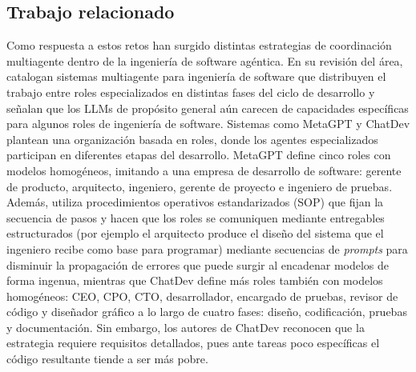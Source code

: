 \subsection{Trabajo relacionado}
\label{sec:trabajo-relacionado}

Como respuesta a estos retos han surgido distintas estrategias de coordinación multiagente dentro de la ingeniería de software agéntica. En su revisión del área, \textcite{he2025masse} catalogan sistemas multiagente para ingeniería de software que distribuyen el trabajo entre roles especializados en distintas fases del ciclo de desarrollo y señalan que los LLMs de propósito general aún carecen de capacidades específicas para algunos roles de ingeniería de software. Sistemas como MetaGPT \parencite{hong2024metagpt} y ChatDev \parencite{qian2024chatdev} plantean una organización basada en roles, donde los agentes especializados participan en diferentes etapas del desarrollo. MetaGPT define cinco roles con modelos homogéneos, imitando a una empresa de desarrollo de software: gerente de producto, arquitecto, ingeniero, gerente de proyecto e ingeniero de pruebas. Además, utiliza procedimientos operativos estandarizados (SOP) que fijan la secuencia de pasos y hacen que los roles se comuniquen mediante entregables estructurados (por ejemplo el arquitecto produce el diseño del sistema que el ingeniero recibe como base para programar) mediante secuencias de \textit{prompts} para disminuir la propagación de errores que puede surgir al encadenar modelos de forma ingenua, mientras que ChatDev define más roles también con modelos homogéneos: CEO, CPO, CTO, desarrollador, encargado de pruebas, revisor de código y diseñador gráfico a lo largo de cuatro fases: diseño, codificación, pruebas y documentación. Sin embargo, los autores de ChatDev reconocen que la estrategia requiere requisitos detallados, pues ante tareas poco específicas el código resultante tiende a ser más pobre.

